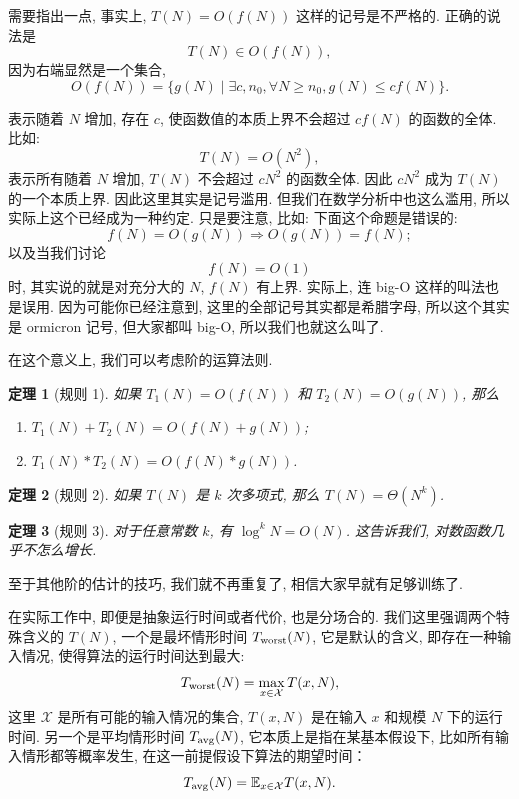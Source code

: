 \documentclass[a4paper]{ctexart}
\newtheorem{theorem}{定理}
\theoremstyle{definition}
\theoremstyle{definition}
\begin{document}
需要指出一点, 事实上, $T(N) = O(f(N))$ 这样的记号是不严格的.
正确的说法是
$$
T(N) \in O(f(N)),
$$
因为右端显然是一个集合, 
$$
O(f(N)) = \{ g(N) \mid \exists c, n_0, \forall N \geq n_0, g(N) \leq cf(N) \}.
$$

表示随着 $N$ 增加, 存在 $c$, 使函数值的本质上界不会超过 $c f(N)$ 的函数的全体.
比如:
$$
T(N) = O(N^2),
$$
表示所有随着 $N$ 增加, $T(N)$ 不会超过 $c N^2$ 的函数全体.
因此 $c N^2$ 成为 $T(N)$ 的一个本质上界. 因此这里其实是记号滥用. 
但我们在数学分析中也这么滥用, 所以实际上这个已经成为一种约定. 只是要注意, 比如: 
下面这个命题是错误的:
$$
f(N) = O(g(N)) \Rightarrow O(g(N)) = f(N); 
$$
以及当我们讨论
$$
f(N) = O(1)
$$
时, 其实说的就是对充分大的 $N$, $f(N)$ 有上界. 实际上, 连 big-O 这样的叫法也是误用.
因为可能你已经注意到, 这里的全部记号其实都是希腊字母, 所以这个其实是 ormicron 记号,
但大家都叫 big-O, 所以我们也就这么叫了.

在这个意义上, 我们可以考虑阶的运算法则.

\begin{theorem}[规则 1]
  如果 $T_1(N) = O(f(N))$ 和 $T_2(N) = O(g(N))$, 那么
\begin{enumerate}
\item $T_1(N) + T_2(N) = O(f(N) + g(N))$;
\item $T_1(N) * T_2(N) = O(f(N) * g(N))$.
\end{enumerate}
\end{theorem}

\begin{theorem}[规则 2]
如果 $T(N)$ 是 $k$ 次多项式, 那么 $T(N) = \Theta(N^k)$.  
\end{theorem}

\begin{theorem}[规则 3]
对于任意常数 $k$, 有 $\log^k N = O(N)$.
这告诉我们, 对数函数几乎不怎么增长.
\end{theorem}

至于其他阶的估计的技巧, 我们就不再重复了, 相信大家早就有足够训练了.

在实际工作中, 即便是抽象运行时间或者代价, 也是分场合的. 我们这里强调两个特殊含义的 $T(N)$,
一个是最坏情形时间 $T_{\rm worst} (N)$, 它是默认的含义, 即存在一种输入情况, 使得算法的运行时间达到最大:
$$
T_{\rm worst} (N) = \max_{x \in \mathcal{X}} T(x, N),
$$
这里 $\mathcal{X}$ 是所有可能的输入情况的集合, $T(x, N)$ 是在输入 $x$ 和规模 $N$ 下的运行时间.
另一个是平均情形时间 $T_{\rm avg}(N)$, 它本质上是指在某基本假设下,
比如所有输入情形都等概率发生, 在这一前提假设下算法的期望时间：
$$
T_{\rm avg}(N) = \mathbb{E}_{x \in \mathcal{X}} T(x, N).
$$
\end{document}
